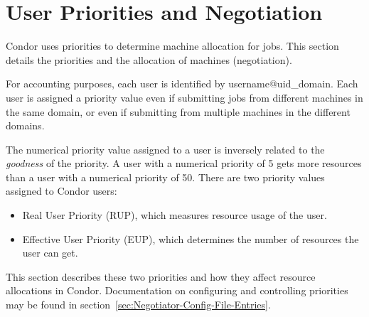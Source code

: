 \section{\label{sec:UserPrio}User Priorities and Negotiation}



Condor uses priorities to determine machine allocation for jobs.
This section details the priorities and the allocation of
machines (negotiation).

For accounting purposes, each user is identified by username@uid\_domain.
Each user is assigned a priority value even if submitting jobs from
different machines in the same domain, or even if submitting from multiple
machines in the different domains.

The numerical priority value assigned to a user is inversely related to the 
\emph{goodness} of the priority.
A user with a numerical priority of 5 gets 
more resources than a user with a numerical priority of 50.
There are two 
priority values assigned to Condor users:
\begin{itemize}
	\item Real User Priority (RUP), which measures resource usage of the 
		user.
	\item Effective User Priority (EUP), which determines the number of
		resources the user can get.
\end{itemize}
This section describes these two priorities and how they affect resource
allocations in Condor.
Documentation on configuring and controlling 
priorities may be found in section~\ref{sec:Negotiator-Config-File-Entries}.


